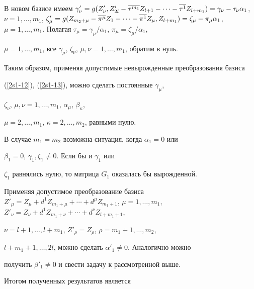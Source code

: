 В новом базисе имеем $\gamma'_\nu = g(Z'_\nu, Z'_{2l} -


\ol{\tau^{m_1}} Z_{l+1} -\dotsb- \ol{\tau^1} Z_{l+m_1}) = \gamma_\nu -


\tau_\nu \alpha_1$, $\nu=1,\dotsc,m_1$, $\zeta'_\mu = g(Z_{m_2+\mu} -


\ol{\pi^{\mu}} Z_1 -\dotsb- \ol{\pi^1} Z_{\mu}, Z_{l+m_1}) = \zeta_\mu


- \pi_\mu \alpha_1$, $\mu=1,\dotsc,m_1$. Полагая $\tau_\mu =


\gamma_\mu / \alpha_1$, $\pi_\mu= \zeta_\mu / \alpha_1$,


$\mu=1,\dotsc,m_1$, все $\gamma_\mu$, $\zeta_\nu$, $\mu,\nu=


1,\dotsc,m_1$, обратим в нуль.





Таким образом, применяя допустимые невырожденные преобразования базиса


(\ref{2s1-12}), (\ref{2s1-13}), можно сделать постоянные $\gamma_\mu$,


$\zeta_\nu$, $\mu,\nu= 1,\dotsc,m_1$, $\alpha_\mu$, $\beta_\kappa$,


$\mu=2,\dotsc,m_1$, $\kappa=2,\dotsc,m_2$, равными нулю.





В случае $m_1=m_2$ возможна ситуация, когда $\alpha_1=0$ или


$\beta_1=0$, $\gamma_1, \zeta_1 \neq 0$. Если бы и $\gamma_1$ или


$\zeta_1$ равнялись нулю, то матрица $G_1$ оказалась бы вырожденной.


Применяя допустимое преобразование базиса $Z'_\mu = Z_\mu + d^1


Z_{m_1+\mu} +\dotsb+ d^\mu Z_{m_1+1}$, $\mu=1,\dotsc,m_1$, $Z'_\nu =


Z_\nu + d^1 Z_{m_1+\nu} +\dotsb+ d^\nu Z_{l+m_1+1}$,


$\nu=l+1,\dotsc,l+m_1$, $Z'_\rho = Z_\rho$, $\rho = m_1+1,\dotsc,m_2$,


$l+m_1+1,\dotsc,2l$, можно сделать $\alpha'_1\neq 0$. Аналогично можно


получить $\beta'_1\neq 0$ и свести задачу к рассмотренной выше.





Итогом полученных результатов является





